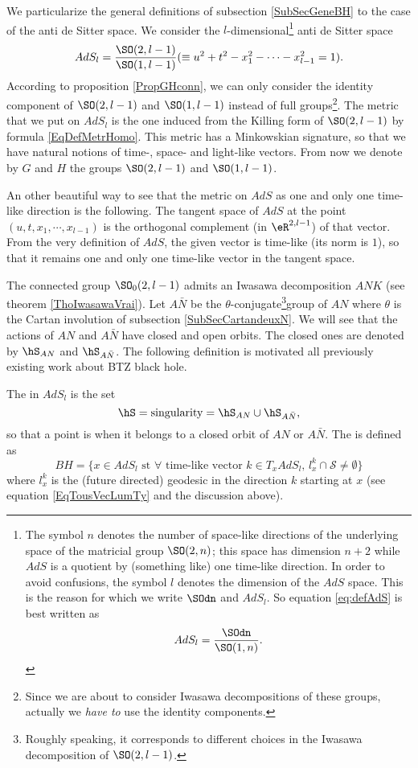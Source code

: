 We particularize the general definitions of subsection \ref{SubSecGeneBH} to the case of the anti de Sitter space. We consider the $l$-dimensional\footnote{The symbol $n$ denotes the number of space-like directions of the underlying space of the matricial group $\SO(2,n)$; this space has dimension $n+2$ while $AdS$ is a quotient by (something like) one time-like direction. In order to avoid confusions, the symbol $l$ denotes the dimension of the $AdS$ space. This is the reason for which we write $\SOdn$ and $AdS_l$. So equation \eqref{eq:defAdS} is best written as \[AdS_l=\frac{\SOdn}{\SO(1,n)}.\]} anti de Sitter space
\begin{equation}    \label{eq:defAdS}
  AdS_l=\frac{ \SO(2,l-1) }{ \SO(1,l-1) }(\equiv u^2+t^2-x_1^2-\cdots-x_{l-1}^2=1).
 \end{equation}
According to proposition \ref{PropGHconn}, we can only consider the identity component of $\SO(2,l-1)$ and $\SO(1,l-1)$ instead of full groups\footnote{Since we are about to consider Iwasawa decompositions of these groups, actually we \emph{have to} use the identity components.}. The metric that we put on $AdS_l$ is the one induced from the Killing form of $\SO(2,l-1)$ by formula \eqref{EqDefMetrHomo}. This metric has a Minkowskian signature, so that we have  natural notions of time-, space- and light-like vectors. From now we denote by $G$ and $H$ the groups $\SO(2,l-1)$ and $\SO(1,l-1)$. 

An other beautiful way to see that the metric on $AdS$ as one and only one time-like direction is the following. The tangent space of $AdS$ at the point $(u,t,x_1,\cdots,x_{l-1})$ is the orthogonal complement (in $\eR^{2,l-1}$) of that vector. From the very definition of $AdS$, the given vector is time-like (its norm is $1$), so that it remains one and only one time-like vector in the tangent space.

The connected group $\SO_0(2,l-1)$ admits an Iwasawa decomposition $ANK$ (see theorem \ref{ThoIwasawaVrai}). Let $A\bar N$ be the $\theta$-conjugate\footnote{Roughly speaking, it corresponds to different choices in the Iwasawa decomposition of $\SO(2,l-1)$.}group of $AN$ where $\theta$ is the Cartan involution of subsection \ref{SubSecCartandeuxN}. We will see that the actions of $AN$ and $A\bar N$ have closed and open orbits. The closed ones are denoted by $\hS_{AN}$ and $\hS_{A\bar N}$. The following definition is motivated all previously existing work about BTZ black hole.

\begin{definition}		\label{Singular}
The  in $AdS_l$ is the set
\[
  \hS=\text{singularity}=\hS_{AN}\cup\hS_{A\bar N},
\]
so that a point is  when it belongs to a closed orbit of $AN$ or $A\bar N$. The  is defined as
\[
  BH=\{ x\in AdS_{l} \text{ st } \forall \text{ time-like vector } k\in T_xAdS_l,\,  l^k_x\cap\mathcal{S}\neq\emptyset \}
\]
where $l^k_x$ is the (future directed) geodesic in the direction $k$ starting at $x$ (see equation \eqref{EqTousVecLumTy} and the discussion above).
\end{definition}

